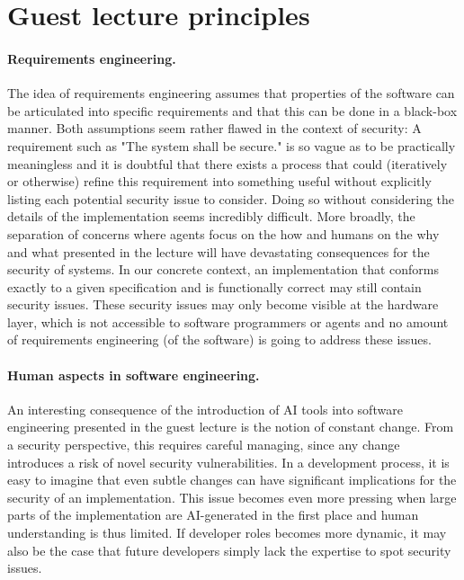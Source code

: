 \documentclass{article}
\begin{document}
\section{Guest lecture principles}

\paragraph{Requirements engineering.} The idea of requirements engineering assumes that properties of the software can be articulated into specific requirements and that this can be done in a black-box manner. Both assumptions seem rather flawed in the context of security: A requirement such as "The system shall be secure." is so vague as to be practically meaningless and it is doubtful that there exists a process that could (iteratively or otherwise) refine this requirement into something useful without explicitly listing each potential security issue to consider. Doing so without considering the details of the implementation seems incredibly difficult. More broadly, the separation of concerns where agents focus on the how and humans on the why and what presented in the lecture will have devastating consequences for the security of systems. In our concrete context, an implementation that conforms exactly to a given specification and is functionally correct may still contain security issues. These security issues may only become visible at the hardware layer, which is not accessible to software programmers or agents and no amount of requirements engineering (of the software) is going to address these issues.

\paragraph{Human aspects in software engineering.} An interesting consequence of the introduction of AI tools into software engineering presented in the guest lecture is the notion of constant change. From a security perspective, this requires careful managing, since any change introduces a risk of novel security vulnerabilities. In a development process, it is easy to imagine that even subtle changes can have significant implications for the security of an implementation. This issue becomes even more pressing when large parts of the implementation are AI-generated in the first place and human understanding is thus limited. If developer roles becomes more dynamic, it may also be the case that future developers simply lack the expertise to spot security issues.
\end{document}

